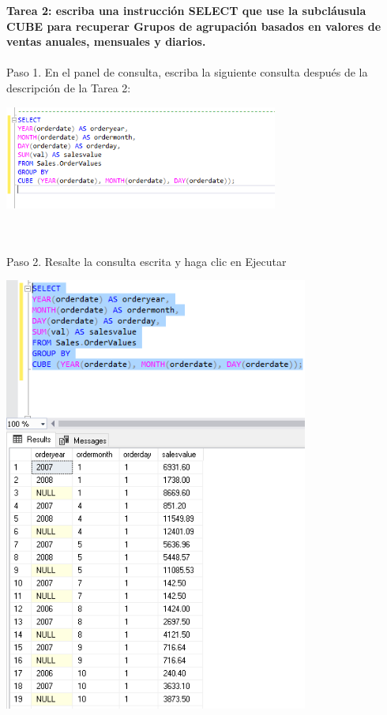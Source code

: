 \begin{flushleft}
\textbf{Tarea 2: escriba una instrucción SELECT que use la subcláusula CUBE para recuperar Grupos de agrupación basados en valores de ventas anuales, mensuales y diarios.}
\textbf{}\\
\textbf{}\\
Paso 1. En el panel de consulta, escriba la siguiente consulta después de la descripción de la Tarea 2:
\begin{center}
	\includegraphics[width=9cm]{./Imagenes/6img3} 
	\end{center}
\textbf{}\\
\textbf{}\\

Paso 2. Resalte la consulta escrita y haga clic en Ejecutar
\begin{center}
	\includegraphics[width=10cm]{./Imagenes/6img4} 
	\end{center}
\textbf{}\\
\textbf{}\\



\end{flushleft}
